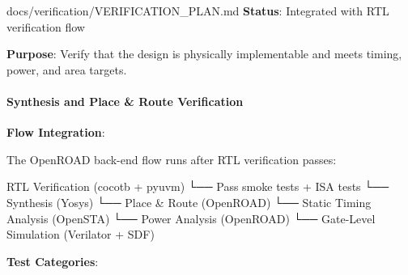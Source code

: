 \begin{relocated}{docs/verification/VERIFICATION_PLAN.md}
\textbf{Status}: Integrated with RTL verification flow

\textbf{Purpose}: Verify that the design is physically implementable and
meets timing, power, and area targets.

\paragraph{Synthesis and Place \& Route Verification}\label{ds:ch:verification-plan:6-synthesis-and-place-route-verification}

\textbf{Flow Integration}:

The OpenROAD back-end flow runs after RTL verification passes:

\begin{textblock}
RTL Verification (cocotb + pyuvm)
    └── Pass smoke tests + ISA tests
        └── Synthesis (Yosys)
            └── Place & Route (OpenROAD)
                └── Static Timing Analysis (OpenSTA)
                    └── Power Analysis (OpenROAD)
                        └── Gate-Level Simulation (Verilator + SDF)
\end{textblock}

\textbf{Test Categories}:

{\small\setlength{\tabcolsep}{4pt}

}
\end{relocated}
